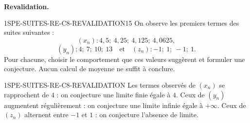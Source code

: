 \textbf{Revalidation.}
\begin{exercice}{1SPE-SUITES-RE-C8-REVALIDATION}{1}{5}
On observe les premiers termes des suites suivantes :
\[
(x_n) : 4{,}5;\ 4{,}25;\ 4{,}125;\ 4{,}0625,
\]
\[
(y_n) : 4;\ 7;\ 10;\ 13
\quad\text{et}\quad
(z_n) : -1;\ 1;\ -1;\ 1.
\]
Pour chacune, choisir le comportement que ces valeurs suggèrent et formuler
une conjecture. Aucun calcul de moyenne ne suffit à conclure.
\end{exercice}

\begin{corrige}{1SPE-SUITES-RE-C8-REVALIDATION}
Les termes observés de $(x_n)$ se rapprochent de $4$ : on conjecture une
limite finie égale à $4$. Ceux de $(y_n)$ augmentent régulièrement : on
conjecture une limite infinie égale à $+\infty$. Ceux de $(z_n)$ alternent
entre $-1$ et $1$ : on conjecture l'absence de limite.
\end{corrige}
